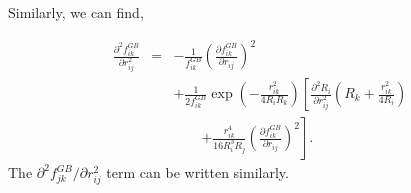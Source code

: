\documentclass[12pt]{article}
\begin{document}
Similarly, we can find, 

\begin{eqnarray}
\label{eq:fGBil2ndderv2}
\frac{\partial^{2} f_{ik}^{GB}}{\partial r_{ij}^{2}} & = & 
-\frac{1}{ f_{ik}^{GB}}\left(\frac{\partial f_{ik}^{GB}}{\partial r_{ij}}\right)^{2}  \nonumber \\
&& + \frac{1}{ 2f_{ik}^{GB}}  \exp\left(-\frac{r_{ik}^2}{4R_{i}R_{k}}\right) \left[
\frac{\partial^{2} R_{i}}{\partial r_{ij}^2}\left(R_k +\frac{r_{ik}^2}{4R_i}  \right) \right. \nonumber \\
&& \qquad \left. + \frac{r_{ik}^4}{16R_i^3R_j}\left(\frac{\partial f_{ik}^{GB}}{\partial r_{ij}}\right)^{2}\right].
\end{eqnarray}
The $\partial^{2} f_{jk}^{GB}/\partial r_{ij}^{2}$ term can be written similarly.
\end{document}
